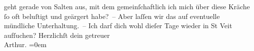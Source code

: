 \begin{ledgroupsized}[t]{13cm}
               geht gerade von Salten aus, mit dem
               gemeinſchaftlich ich mich über diese Kräche \introOben{}ſo oft\introOben{} beluſtigt
               und geärgert habe? – Aber laſſen wir das auf eventuelle mündliche Unterhaltung. – Ich
               darf dich wohl dieſer Tage wieder in St Veit
               aufſuchen?\pend
           \pstart
           Herzlichſt dein getreuer{\\[\baselineskip]}\spacefill\mbox{Arthur.}\pend
           \leftskip=0em{}\endnumbering{}\end{ledgroupsized}  \newcommand{\dateiname}{L01338}\newcommand{\titel}{Arthur Schnitzler an Hermann Bahr, 10. 11. 1903}\newcommand{\editorInnen}{ Kurt Ifkovits,  Martin Anton Müller}
      